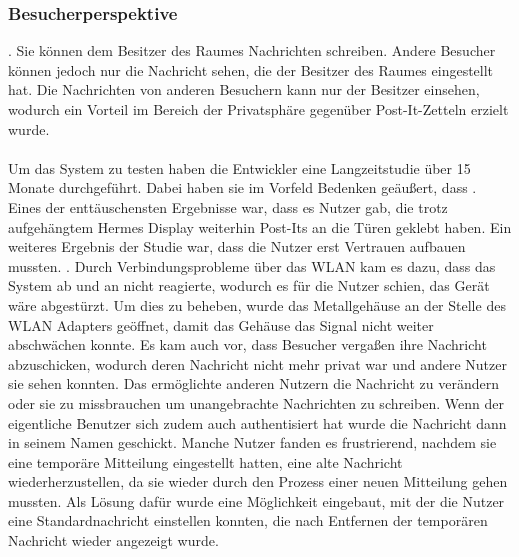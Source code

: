 \subsubsection{Besucherperspektive}
. Sie können dem Besitzer des Raumes Nachrichten schreiben. Andere Besucher können jedoch nur die Nachricht sehen, die der Besitzer des Raumes eingestellt hat. Die Nachrichten von anderen Besuchern kann nur der Besitzer einsehen, wodurch ein Vorteil im Bereich der Privatsphäre gegenüber Post-It-Zetteln erzielt wurde.
\\
\\
Um das System zu testen haben die Entwickler eine Langzeitstudie über 15 Monate durchgeführt. Dabei haben sie im Vorfeld Bedenken geäußert, dass .
Eines der enttäuschensten Ergebnisse war, dass es Nutzer gab, die trotz aufgehängtem Hermes Display weiterhin Post-Its an die Türen geklebt haben\cite{cheverest:2003:paper}.
Ein weiteres Ergebnis der Studie war, dass die Nutzer erst Vertrauen aufbauen mussten. . Durch Verbindungsprobleme über das WLAN kam es dazu, dass das System ab und an nicht reagierte, wodurch es für die Nutzer schien, das Gerät wäre abgestürzt. Um dies zu beheben, wurde das Metallgehäuse an der Stelle des WLAN Adapters geöffnet, damit das Gehäuse das Signal nicht weiter abschwächen konnte.
Es kam auch vor, dass Besucher vergaßen ihre Nachricht abzuschicken, wodurch deren Nachricht nicht mehr privat war und andere Nutzer sie sehen konnten. Das ermöglichte anderen Nutzern die Nachricht zu verändern oder sie zu missbrauchen um unangebrachte Nachrichten zu schreiben. Wenn der eigentliche Benutzer sich zudem auch authentisiert hat wurde die Nachricht dann in seinem Namen geschickt\cite{cheverest:2003:article}.
Manche Nutzer fanden es frustrierend, nachdem sie eine temporäre Mitteilung eingestellt hatten, eine alte Nachricht wiederherzustellen, da sie wieder durch den Prozess einer neuen Mitteilung gehen mussten. Als Lösung dafür wurde eine Möglichkeit eingebaut, mit der die Nutzer eine Standardnachricht einstellen konnten, die nach Entfernen der temporären Nachricht wieder angezeigt wurde\cite{cheverest:2003:article}.
\\
